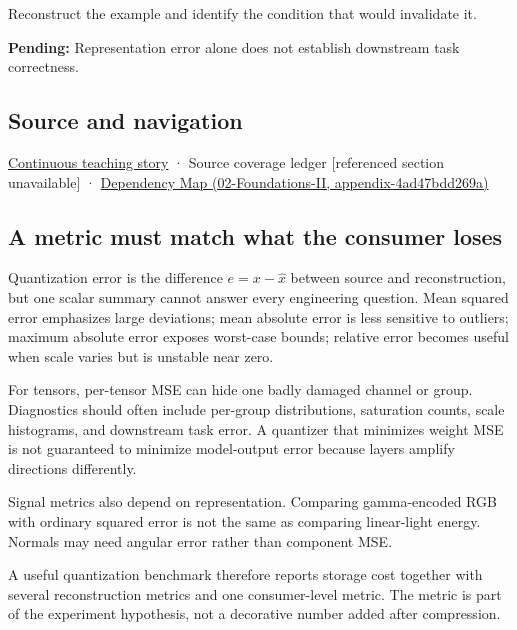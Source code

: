 Reconstruct the example and identify the condition that would invalidate it.

\textbf{Pending:} Representation error alone does not establish downstream task correctness.

\subsection{Source and navigation}\label{appendix-537171d69d27-source-and-navigation}

\hyperref[01-foundations-i-ch001-choosing-what-information-to-keep]{Continuous teaching story} · {Source coverage ledger {[}referenced section unavailable{]}} · \href{../02-Foundations-II/main.pdf\#nameddest=appendix-4ad47bdd269a}{Dependency Map (02-Foundations-II, appendix-4ad47bdd269a)}

\subsection{A metric must match what the consumer loses}\label{appendix-537171d69d27-a-metric-must-match-what-the-consumer-loses}

Quantization error is the difference \(e=x-\hat x\) between source and reconstruction, but one scalar summary cannot answer every engineering question. Mean squared error emphasizes large deviations; mean absolute error is less sensitive to outliers; maximum absolute error exposes worst-case bounds; relative error becomes useful when scale varies but is unstable near zero.

For tensors, per-tensor MSE can hide one badly damaged channel or group. Diagnostics should often include per-group distributions, saturation counts, scale histograms, and downstream task error. A quantizer that minimizes weight MSE is not guaranteed to minimize model-output error because layers amplify directions differently.

Signal metrics also depend on representation. Comparing gamma-encoded RGB with ordinary squared error is not the same as comparing linear-light energy. Normals may need angular error rather than component MSE.

A useful quantization benchmark therefore reports storage cost together with several reconstruction metrics and one consumer-level metric. The metric is part of the experiment hypothesis, not a decorative number added after compression.
